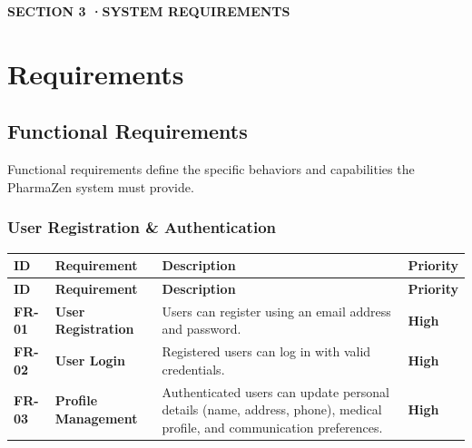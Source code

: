\documentclass[12pt, a4paper]{article}
\newcommand{\sectionbadge}[2]{%
  \vspace{12pt}
  \noindent
  \colorbox{pharmagreen}{%
    \parbox{\dimexpr\textwidth-2\fboxsep\relax}{%
      \vspace{4pt}
      \color{white}\small\bfseries\MakeUppercase{SECTION #1 \quad·\quad #2}
      \vspace{4pt}
    }%
  }
  \vspace{6pt}
}
\newcommand{\phigh}{\textcolor{priorityhigh}{\textbf{High}}}
\newcommand{\rid}[1]{\textcolor{pharmagreen}{\textbf{\small #1}}}
\begin{document}
\newpage

\sectionbadge{3}{System Requirements}
\section{Requirements}

\subsection{Functional Requirements}

Functional requirements define the specific behaviors and capabilities the PharmaZen system must provide.

\newcommand{\reqtablestart}{%
  \renewcommand{\arraystretch}{1.45}
  \begin{longtable}{|L{1.4cm}|L{3.2cm}|L{8.6cm}|L{1.6cm}|}
  \hline
  \rowcolor{pharmagreen}
  \textbf{\color{white}\small ID} &
  \textbf{\color{white}\small Requirement} &
  \textbf{\color{white}\small Description} &
  \textbf{\color{white}\small Priority} \\
  \hline
  \endfirsthead
  \hline
  \rowcolor{pharmagreen}
  \textbf{\color{white}\small ID} &
  \textbf{\color{white}\small Requirement} &
  \textbf{\color{white}\small Description} &
  \textbf{\color{white}\small Priority} \\
  \hline
  \endhead
}
\newcommand{\reqtableend}{\end{longtable}}

\subsubsection{User Registration \& Authentication}

\reqtablestart
\rid{FR-01} & \textbf{\small User Registration} & \small Users can register using an email address and password. & \phigh \\
\hline
{}\rid{FR-02} & \textbf{\small User Login} & \small Registered users can log in with valid credentials. & \phigh \\
\hline
\rid{FR-03} & \textbf{\small Profile Management} & \small Authenticated users can update personal details (name, address, phone), medical profile, and communication preferences. & \phigh \\
\hline
\reqtableend
\end{document}
